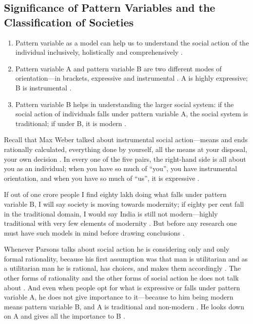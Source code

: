 \subsection{Significance of Pattern Variables and the Classification of Societies}
\begin{enumerate}
    \item Pattern variable as a model can help us to understand the social action of the individual inclusively, holistically and comprehensively .
    \item Pattern variable A and pattern variable B are two different modes of orientation---in brackets, expressive and instrumental . A is highly expressive; B is instrumental .
    \item Pattern variable B helps in understanding the larger social system: if the social action of individuals falls under pattern variable A, the social system is traditional; if under B, it is modern .
\end{enumerate}

Recall that Max Weber talked about instrumental social action---means and ends rationally calculated, everything done by yourself, all the means at your disposal, your own decision . In every one of the five pairs, the right-hand side is all about you as an individual; when you have so much of ``you'', you have instrumental orientation, and when you have so much of ``us'', it is expressive .

If out of one crore people I find eighty lakh doing what falls under pattern variable B, I will say society is moving towards modernity; if eighty per cent fall in the traditional domain, I would say India is still not modern---highly traditional with very few elements of modernity . But before any research one must have such models in mind before drawing conclusions .

\begin{CriticalPoint}
Whenever Parsons talks about social action he is considering only and only formal rationality, because his first assumption was that man is utilitarian and as a utilitarian man he is rational, has choices, and makes them accordingly . The other forms of rationality and the other forms of social action he does not talk about .
And even when people opt for what is expressive or falls under pattern variable A, he does not give importance to it---because to him being modern means pattern variable B, and A is traditional and non-modern . He looks down on A and gives all the importance to B .
\end{CriticalPoint}

